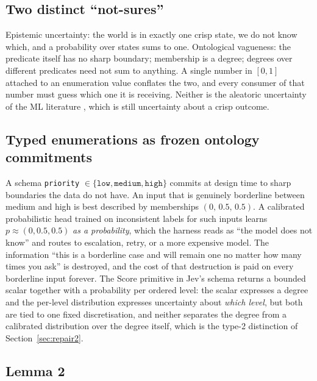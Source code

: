 \documentclass[11pt,a4paper]{article}
\numberwithin{equation}{section}
\theoremstyle{plain}
\theoremstyle{definition}
\theoremstyle{remark}
\begin{document}
\subsection{Two distinct ``not-sures''}

Epistemic uncertainty: the world is in exactly one crisp state, we do not know which, and a probability over states sums to one. Ontological vagueness: the predicate itself has no sharp boundary; membership is a degree; degrees over different predicates need not sum to anything. A single number in $[0,1]$ attached to an enumeration value conflates the two, and every consumer of that number must guess which one it is receiving. Neither is the aleatoric uncertainty of the ML literature \citep{hullermeier2021}, which is still uncertainty about a crisp outcome.

\subsection{Typed enumerations as frozen ontology commitments}

A schema \texttt{priority} $\in\{\texttt{low},\texttt{medium},\texttt{high}\}$ commits at design time to sharp boundaries the data do not have. An input that is genuinely borderline between medium and high is best described by memberships $(0,\,0.5,\,0.5)$. A calibrated probabilistic head trained on inconsistent labels for such inputs learns $p\approx(0,0.5,0.5)$ \emph{as a probability}, which the harness reads as ``the model does not know'' and routes to escalation, retry, or a more expensive model. The information ``this is a borderline case and will remain one no matter how many times you ask'' is destroyed, and the cost of that destruction is paid on every borderline input forever. The Score primitive in Jev's schema \citep{typesafe2026docs} returns a bounded scalar together with a probability per ordered level: the scalar expresses a degree and the per-level distribution expresses uncertainty about \emph{which level}, but both are tied to one fixed discretisation, and neither separates the degree from a calibrated distribution over the degree itself, which is the type-2 distinction of Section~\ref{sec:repair2}.

\subsection{Lemma 2}
\end{document}
